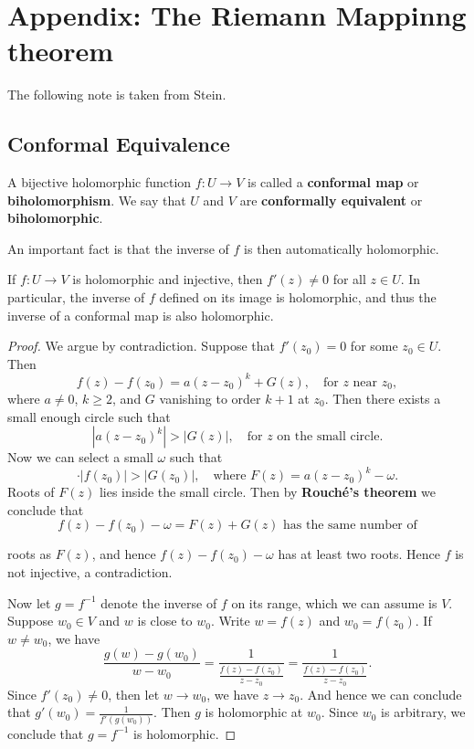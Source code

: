 \documentclass{article}
\begin{document}
\newpage
\section*{Appendix: The Riemann Mappinng theorem}
The following note is taken from Stein.

\subsection*{Conformal Equivalence}

\begin{definition}
A bijective holomorphic function $f: U \to V$ is called a \textbf{conformal map} or \textbf{biholomorphism}. We say that $U$ and $V$ are \textbf{conformally equivalent} or \textbf{biholomorphic}.
\end{definition}

An important fact is that the inverse of $f$ is then automatically holomorphic.

\begin{proposition}
If $f: U \to V$ is holomorphic and injective, then $f'(z) \ne 0$ for all $z \in U$. In particular, the inverse of $f$ defined on its image is holomorphic, and thus the inverse of a conformal map is also holomorphic.
\end{proposition}

\begin{proof}
We argue by contradiction. Suppose that $f'(z_0) = 0$ for some $z_0 \in U$. Then
$$f(z) - f(z_0) = a(z-z_0)^k + G(z), \quad \text{for } z \text{ near } z_0,$$
where $a \ne 0$, $k \ge 2$, and $G$ vanishing to order $k+1$ at $z_0$.
Then there exists a small enough circle such that
$$|a(z-z_0)^k| > |G(z)|, \quad \text{for } z \text{ on the small circle.}$$
Now we can select a small $\omega$ such that
$$\cdot |f(z_0) | > |G(z_0)|, \quad \text{where } F(z) = a(z-z_0)^k - \omega.$$
Roots of $F(z)$ lies inside the small circle.
Then by \textbf{Rouch\'e's theorem} we conclude that
$$f(z) - f(z_0) - \omega = F(z) + G(z) \text{ has the same number of}$$

roots as $F(z)$, and hence $f(z) - f(z_0) - \omega$ has at least two roots.
Hence $f$ is not injective, a contradiction.

Now let $g = f^{-1}$ denote the inverse of $f$ on its range, which we can assume is $V$. Suppose $w_0 \in V$ and $w$ is close to $w_0$. Write $w = f(z)$ and $w_0 = f(z_0)$. If $w \ne w_0$, we have
$$\frac{g(w) - g(w_0)}{w - w_0} = \frac{1}{\frac{f(z) - f(z_0)}{z - z_0}} = \frac{1}{\frac{f(z) - f(z_0)}{z - z_0}}.$$
Since $f'(z_0) \ne 0$, then let $w \to w_0$, we have $z \to z_0$.
And hence we can conclude that $g'(w_0) = \frac{1}{f'(g(w_0))}$.
Then $g$ is holomorphic at $w_0$. Since $w_0$ is arbitrary, we conclude that $g = f^{-1}$ is holomorphic.
\end{proof}
\end{document}
